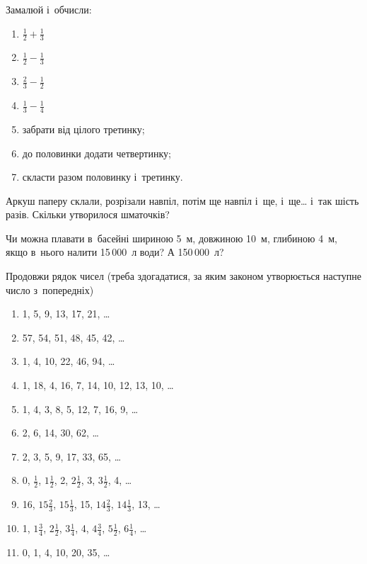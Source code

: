 \problem
Замалюй і~обчисли:
\begin{enumerate}
    \item $\frac{1}{2} + \frac{1}{3}$
    \item $\frac{1}{2} - \frac{1}{3}$
    \item $\frac{2}{3} - \frac{1}{2}$
    \item $\frac{1}{3} - \frac{1}{4}$
    \item забрати від цілого третинку;
    \item до половинки додати четвертинку;
    \item скласти разом половинку і~третинку.
\end{enumerate}


\problem
Аркуш паперу склали, розрізали навпіл, потім ще навпіл і~ще, і~ще\ldots
 і~так шість разів.
Скільки утворилося шматочків?


\problem
Чи можна плавати в~басейні шириною 5~м, довжиною 10~м, глибиною 4~м,
якщо в~нього налити 15\,000~л води? А 150\,000~л?


\problem
Продовжи рядок чисел (треба здогадатися, за яким законом утворюється
наступне число з~попередніх)
\begin{enumerate}
    \item 1, 5, 9, 13, 17, 21, \ldots
    \item 57, 54, 51, 48, 45, 42, \ldots
    \item 1, 4, 10, 22, 46, 94, \ldots
    \item 1, 18, 4, 16, 7, 14, 10, 12, 13, 10, \ldots
    \item 1, 4, 3, 8, 5, 12, 7, 16, 9, \ldots
    \item 2, 6, 14, 30, 62, \ldots
    \item 2, 3, 5, 9, 17, 33, 65, \ldots
    \item 0, $\frac{1}{2}$, $1\frac{1}{2}$,
    2, $2\frac{1}{2}$, 3, $3\frac{1}{2}$, 4, \ldots
    \item 16, $15\frac{2}{3}$, $15\frac{1}{3}$, 15,
    $14\frac{2}{3}$, $14\frac{1}{3}$, 13, \ldots
    \item 1, $1\frac{3}{4}$, $2\frac{1}{2}$, $3\frac{1}{4}$,
    4, $4\frac{3}{4}$, $5\frac{1}{2}$, $6\frac{1}{4}$, \ldots
    \item 0, 1, 4, 10, 20, 35, \ldots
\end{enumerate}


